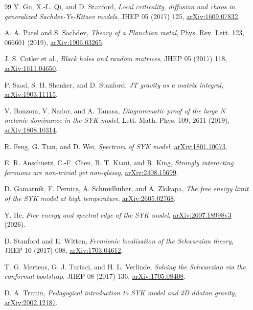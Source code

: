 \documentclass[11pt]{article}
\numberwithin{equation}{section}
\theoremstyle{exposition}
\theoremstyle{result}
\begin{document}
\begin{thebibliography}{99}
Y. Gu, X.-L. Qi, and D. Stanford,
\emph{Local criticality, diffusion and chaos in generalized Sachdev-Ye-Kitaev models},
JHEP 05 (2017) 125, \href{https://arxiv.org/abs/1609.07832}{arXiv:1609.07832}.

A. A. Patel and S. Sachdev,
\emph{Theory of a Planckian metal},
Phys. Rev. Lett. 123, 066601 (2019), \href{https://arxiv.org/abs/1906.03265}{arXiv:1906.03265}.

J. S. Cotler et al.,
\emph{Black holes and random matrices},
JHEP 05 (2017) 118, \href{https://arxiv.org/abs/1611.04650}{arXiv:1611.04650}.

P. Saad, S. H. Shenker, and D. Stanford,
\emph{JT gravity as a matrix integral},
\href{https://arxiv.org/abs/1903.11115}{arXiv:1903.11115}.

V. Bonzom, V. Nador, and A. Tanasa,
\emph{Diagrammatic proof of the large $N$ melonic dominance in the SYK model},
Lett. Math. Phys. 109, 2611 (2019), \href{https://arxiv.org/abs/1808.10314}{arXiv:1808.10314}.

R. Feng, G. Tian, and D. Wei,
\emph{Spectrum of SYK model},
\href{https://arxiv.org/abs/1801.10073}{arXiv:1801.10073}.

E. R. Anschuetz, C.-F. Chen, B. T. Kiani, and R. King,
\emph{Strongly interacting fermions are non-trivial yet non-glassy},
\href{https://arxiv.org/abs/2408.15699}{arXiv:2408.15699}.

D. Gamarnik, F. Pernice, A. Schmidhuber, and A. Zlokapa,
\emph{The free energy limit of the SYK model at high temperature},
\href{https://arxiv.org/abs/2605.02768}{arXiv:2605.02768}.

Y. He,
\emph{Free energy and spectral edge of the SYK model},
\href{https://arxiv.org/abs/2607.18998v3}{arXiv:2607.18998v3} (2026).

D. Stanford and E. Witten,
\emph{Fermionic localization of the Schwarzian theory},
JHEP 10 (2017) 008, \href{https://arxiv.org/abs/1703.04612}{arXiv:1703.04612}.

T. G. Mertens, G. J. Turiaci, and H. L. Verlinde,
\emph{Solving the Schwarzian via the conformal bootstrap},
JHEP 08 (2017) 136, \href{https://arxiv.org/abs/1705.08408}{arXiv:1705.08408}.

D. A. Trunin,
\emph{Pedagogical introduction to SYK model and 2D dilaton gravity},
\href{https://arxiv.org/abs/2002.12187}{arXiv:2002.12187}.

\end{thebibliography}
\end{document}

